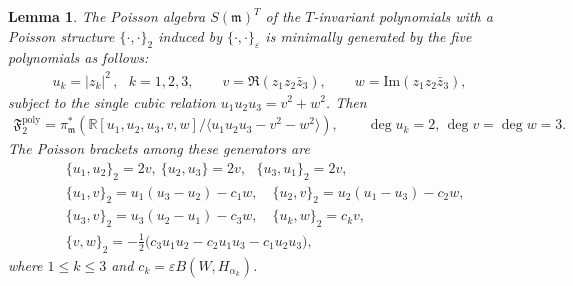 \documentclass[10pt,a4paper]{amsart}
\newtheorem{lemma}{Lemma}
\begin{document}
 \begin{lemma}
 \label{alg1}
The Poisson algebra $S(\mathfrak{m})^T$ of the $T$-invariant polynomials with a Poisson structure $\{\cdot,\cdot\}_2$ induced by $\{\cdot,\cdot\}_\varepsilon$ is minimally generated by the five polynomials as follows:  \begin{align*}
    u_k=|z_k|^2\,, \text{ } k=1,2,3 ,\qquad v=\Re(z_1z_2\bar z_3),\qquad w=\mathrm{Im}(z_1z_2\bar z_3),
\end{align*} subject to the single cubic relation $ u_1u_2u_3=v^2+w^2 $.  Then   \begin{align*}
    \mathfrak{F}_2^{\mathrm{poly}} =  \pi_\mathfrak{m}^* \left(\mathbb{R}[u_1,u_2,u_3,v,w]\Big/ \langle u_1u_2u_3-v^2-w^2\rangle\right), \qquad \deg u_k=2,\,\deg v=\deg w=3.
\end{align*}  The Poisson brackets among these generators are  \begin{align}
 \nonumber
     &\{u_1,u_2\}_2=2v,\ \{u_2,u_3\}=2v,\ \ \ \{u_3,u_1\}_2=2v,\\
     \nonumber
&\{u_1,v\}_2=u_1(u_3-u_2)-c_1w,\quad    \{u_2,v\}_2=u_2(u_1-u_3)-c_2w,\\
&\{u_3,v\}_2=u_3(u_2-u_1)-c_3w,\quad   \{u_k,w\}_2=c_k v,\\
  \nonumber
&\{v,w\}_2=-\frac{1}{2}\big(c_3u_1u_2-c_2u_1u_3-c_1u_2u_3\big),
 \end{align}  where $ 1\leq  k \leq 3$ and $c_k = \varepsilon B(W,H_{\alpha_k})$. %
\end{lemma}
\end{document}
